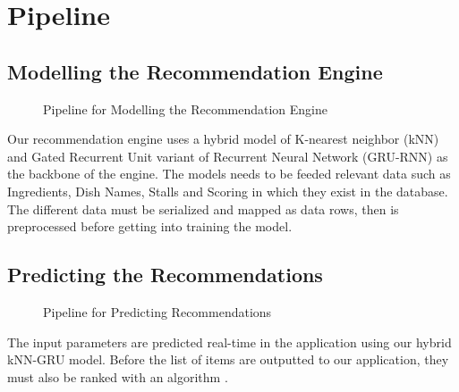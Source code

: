 
\newpage

\section{Pipeline}
\label{section:pipeline}

\subsection{Modelling the Recommendation Engine}
\begin{figure}[h!]
    \centering
    
    \caption{Pipeline for Modelling the Recommendation Engine}
\end{figure}

Our recommendation engine uses a hybrid model of K-nearest neighbor (kNN)
and Gated Recurrent Unit variant of Recurrent Neural Network (GRU-RNN) as the backbone of the engine.
The models needs to be feeded relevant data such as Ingredients, Dish Names, Stalls and Scoring in which they exist in
the database. The different data must be serialized and mapped as data rows, then is preprocessed before getting into training the model. \cite{bansalandbaliyan:2023}

\subsection{Predicting the Recommendations}
\begin{figure}[h!]
    \centering
    
    \caption{Pipeline for Predicting Recommendations}
\end{figure}

The input parameters are predicted real-time in the application using our hybrid kNN-GRU model.
Before the list of items are outputted to our application, they must also be ranked with an algorithm \cite{bansalandbaliyan:2023}.